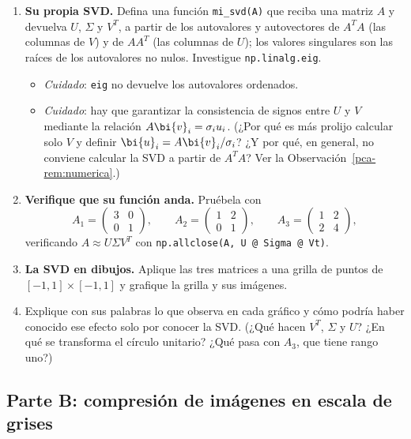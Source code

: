 \begin{enumerate}[leftmargin=*,label=\textbf{TP.\arabic*},ref=TP.\arabic*,itemsep=6pt]

\item \textbf{Su propia SVD.} Defina una función \texttt{mi\_svd(A)} que reciba
una matriz $A$ y devuelva $U$, $\Sigma$ y $V^T$, a partir de los
autovalores y autovectores de $A^T A$ (las columnas de $V$) y de
$AA^T$ (las columnas de $U$); los valores singulares son las raíces de los
autovalores no nulos. Investigue \texttt{np.linalg.eig}.
\begin{itemize}[itemsep=1pt]
\item \emph{Cuidado}: \texttt{eig} no devuelve los autovalores ordenados.
\item \emph{Cuidado}: hay que garantizar la consistencia de signos entre $U$ y
$V$ mediante la relación $A\bi{v}_i=\sigma_iu_i$. (¿Por qué es más prolijo calcular
solo $V$ y definir $\bi{u}_i=A\bi{v}_i/\sigma_i$? ¿Y por qué, en general, no conviene
calcular la SVD a partir de $A^T A$? Ver la
Observación~\ref{pca-rem:numerica}.)
\end{itemize}

\item \textbf{Verifique que su función anda.} Pruébela con
\[
A_1=\begin{pmatrix}3&0\\0&1\end{pmatrix},\qquad
A_2=\begin{pmatrix}1&2\\0&1\end{pmatrix},\qquad
A_3=\begin{pmatrix}1&2\\2&4\end{pmatrix},
\]
verificando $A\approx U\Sigma V^T$ con
\texttt{np.allclose(A, U @ Sigma @ Vt)}.

\item \textbf{La SVD en dibujos.} Aplique las tres matrices a una grilla de
puntos de $[-1,1]\times[-1,1]$ y grafique la grilla y sus imágenes.

\item Explique con sus palabras lo que observa en cada gráfico y cómo podría
haber conocido ese efecto solo por conocer la SVD. (¿Qué hacen $V^T$,
$\Sigma$ y $U$? ¿En qué se transforma el círculo unitario? ¿Qué pasa con $A_3$,
que tiene rango uno?)

\end{enumerate}

\subsection*{Parte B: compresión de imágenes en escala de grises}

